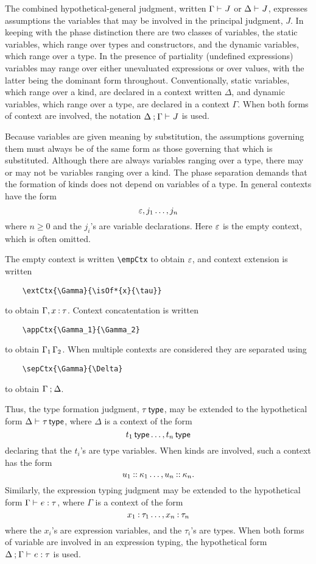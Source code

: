 \documentclass[11pt]{article}
\begin{document}
The combined hypothetical-general judgment, written $\Gamma\entails J$ or $\Delta\entails J$, expresses assumptions the variables that may be involved in the principal judgment, $J$.  In keeping with the phase distinction there are two classes of variables, the static variables, which range over types and constructors, and the dynamic variables, which range over a type.  In the presence of partiality (undefined expressions) variables may range over either unevaluated expressions or over values, with the latter being the dominant form throughout.  Conventionally, static variables, which range over a kind, are declared in a context written $\Delta$, and dynamic variables, which range over a type, are declared in a context $\Gamma$.  When both forms of context are involved, the notation $\sepCtx{\Delta}{\Gamma}\entails J$ is used.

Because variables are given meaning by substitution, the assumptions governing them must always be of the same form as those governing that which is substituted.  Although there are always variables ranging over a type, there may or may not be variables ranging over a kind.  The phase separation demands that the formation of kinds does not depend on variables of a type.  In general contexts have the form
\[
    \varepsilon,j_1\dots,j_n
\]
where $n\geq 0$ and the $j_i$'s are variable declarations.  Here $\varepsilon$ is the empty context, which is often omitted.

The empty context is written \verb|\empCtx| to obtain $\varepsilon$, and context extension is written 
\begin{verbatim}
    \extCtx{\Gamma}{\isOf*{x}{\tau}}
\end{verbatim}
to obtain $\extCtx{\Gamma}{\isOf*{x}{\tau}}$.  Context concatentation is written 
\begin{verbatim}
    \appCtx{\Gamma_1}{\Gamma_2}
\end{verbatim}
to obtain $\Gamma_1\,\Gamma_2$.  When multiple contexts are considered they are separated using 
\begin{verbatim}
    \sepCtx{\Gamma}{\Delta}
\end{verbatim}
to obtain $\Gamma\mathbin{;}\Delta$.

Thus, the type formation judgment, $\isTp{\tau}$, may be extended to the hypothetical form $\Delta\entails\isTp{\tau}$, where $\Delta$ is a context of the form
\[
    \extCtx{\isTp{t_1}\dots}{\isTp{t_n}}
\]
declaring that the $t_i$'s are type variables.  When kinds are involved, such a context has the form
\[
    \extCtx{\isOfKd*{u_1}{\kappa_1}\dots}{\isOfKd*{u_n}{\kappa_n}}.
\]
Similarly, the expression typing judgment may be extended to the hypothetical form $\Gamma\entails \isOf{e}{\tau}$, where $\Gamma$ is a context of the form
\[
    \extCtx{\isOf*{x_1}{\tau_1}\dots}{\isOf*{x_n}{\tau_n}}
\]
where the $x_i$'s are expression variables, and the $\tau_i$'s are types.  When both forms of variable are involved in an expression typing, the hypothetical form $\sepCtx{\Delta}{\Gamma}\entails \isOf{e}{\tau}$ is used.
\end{document}
